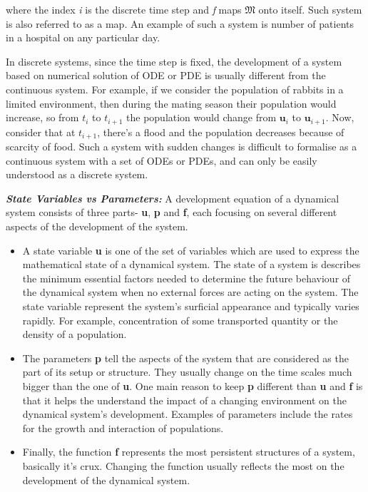 where the index \textit{i} is the discrete time step and \textit{f} maps $ \mathfrak{M} $ onto itself. Such system is also referred to as a map. An example of such a system is number of patients in a hospital on any particular day.

In discrete systems, since the time step is fixed, the development of a system based on numerical solution of ODE or PDE is usually different from the continuous system. For example, if we consider the population of rabbits in a limited environment, then during the mating season their population would increase, so from $ \textit{t}_i $ to $ \textit{t}_{i+1} $ the population would change from $\textbf{u}_{i}$ to $\textbf{u}_{i+1}$. Now, consider that at $\textit{t}_{i+1}$, there’s a flood and the population decreases because of scarcity of food. Such a system with sudden changes is difficult to formalise as a continuous system with a set of ODEs or PDEs, and can only be easily understood as a discrete system.


\textbf{\textit{State Variables vs Parameters:}} A development equation of a dynamical system consists of three parts- \textbf{u}, \textbf{p} and \textbf{f}, each focusing on several different aspects of the development of the system.
\begin{itemize}
	\item A state variable \textbf{u} is one of the set of variables which are used to express the mathematical state of a dynamical system. The state of a system is describes the minimum essential factors needed to determine the future behaviour of the dynamical system when no external forces are acting on the system. The state variable represent the system's surficial appearance and typically varies rapidly. For example, concentration of some transported quantity or the density of a population.
	\item The parameters \textbf{p} tell the aspects of the system that are considered as the part of its setup or structure. They usually change on the time scales much bigger than the one of \textbf{u}. One main reason to keep \textbf{p} different than \textbf{u} and \textbf{f} is that it helps the understand the impact of a changing environment on the dynamical system's development. Examples of parameters include the rates for the growth and interaction of populations.
	\item Finally, the function \textbf{f} represents the most persistent structures of a system, basically it's crux. Changing the function usually reflects the most on the development of the dynamical system.
\end{itemize}

